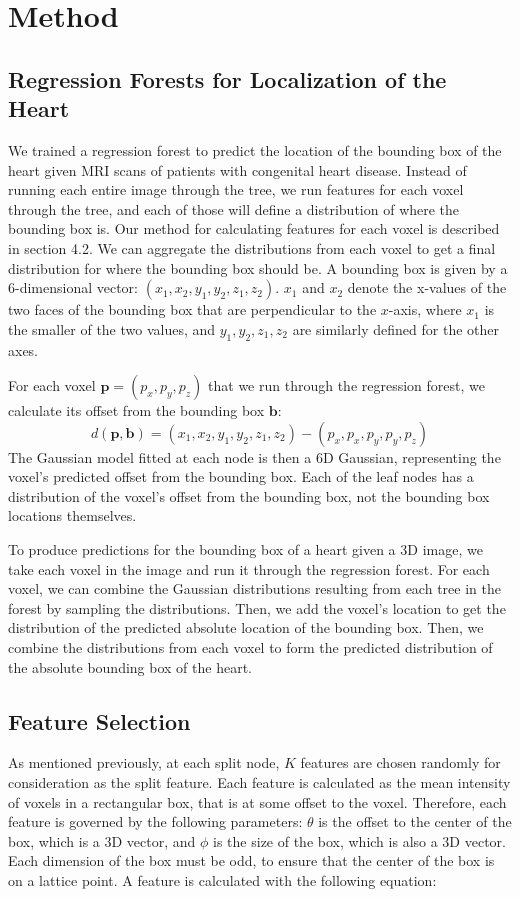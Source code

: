 \section{Method}
\subsection{Regression Forests for Localization of the Heart}
We trained a regression forest to predict the location of the bounding box of the heart given MRI scans of patients with congenital heart disease. Instead of running each entire image through the tree, we run features for each voxel through the tree, and each of those will define a distribution of where the bounding box is. Our method for calculating features for each voxel is described in section 4.2. We can aggregate the distributions from each voxel to get a final distribution for where the bounding box should be. A bounding box is given by a 6-dimensional vector: $(x_1, x_2, y_1, y_2, z_1, z_2)$. $x_1$ and $x_2$ denote the x-values of the two faces of the bounding box that are perpendicular to the $x$-axis, where $x_1$ is the smaller of the two values, and $y_1, y_2, z_1, z_2$ are similarly defined for the other axes.

For each voxel $\mathbf{p}=(p_x, p_y, p_z)$ that we run through the regression forest, we calculate its offset from the bounding box $\mathbf{b}$:
\begin{equation}
  d(\mathbf{p}, \mathbf{b}) = (x_1, x_2, y_1, y_2, z_1, z_2) - (p_x, p_x, p_y, p_y, p_z)
\end{equation}
The Gaussian model fitted at each node is then a 6D Gaussian, representing the voxel's predicted offset from the bounding box. Each of the leaf nodes has a distribution of the voxel's offset from the bounding box, not the bounding box locations themselves.

To produce predictions for the bounding box of a heart given a 3D image, we take each voxel in the image and run it through the regression forest. For each voxel, we can combine the Gaussian distributions resulting from each tree in the forest by sampling the distributions. Then, we add the voxel's location to get the distribution of the predicted absolute location of the bounding box. Then, we combine the distributions from each voxel to form the predicted distribution of the absolute bounding box of the heart.

\subsection{Feature Selection}
As mentioned previously, at each split node, $K$ features are chosen randomly for consideration as the split feature. Each feature is calculated as the mean intensity of voxels in a rectangular box, that is at some offset to the voxel. Therefore, each feature is governed by the following parameters: $\theta$ is the offset to the center of the box, which is a 3D vector, and $\phi$ is the size of the box, which is also a 3D vector. Each dimension of the box must be odd, to ensure that the center of the box is on a lattice point. A feature is calculated with the following equation:

